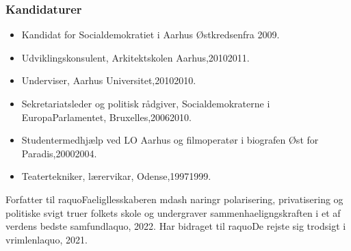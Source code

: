 \documentclass[11pt, a4paper]{awesome-cv}
\begin{document}
\begin{cvletter}
\subsubsection*{Kandidaturer}
\begin{itemize}
\item Kandidat for Socialdemokratiet i Aarhus Østkredsenfra 2009.
\end{itemize}
\begin{itemize}
\item Udviklingskonsulent, Arkitektskolen Aarhus,20102011.
\item Underviser, Aarhus Universitet,20102010.
\item Sekretariatsleder og politisk rådgiver, Socialdemokraterne i EuropaParlamentet, Bruxelles,20062010.
\item Studentermedhjælp ved LO Aarhus og filmoperatør i biografen Øst for Paradis,20002004.
\item Teatertekniker, lærervikar, Odense,19971999.
\end{itemize}
Forfatter til raquoFaeligllesskaberen mdash naringr polarisering, privatisering og politiske svigt truer folkets skole og undergraver sammenhaeligngskraften i et af verdens bedste samfundlaquo, 2022. Har bidraget til raquoDe rejste sig trodsigt i vrimlenlaquo, 2021.

\end{cvletter}
\end{document}
